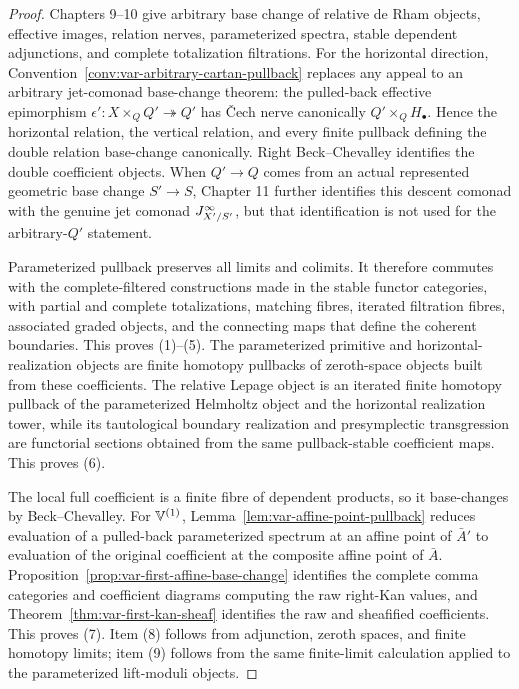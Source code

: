 \begin{proof}
Chapters 9--10 give arbitrary base change of relative de Rham objects, effective images, relation nerves, parameterized spectra, stable dependent adjunctions, and complete totalization filtrations. For the horizontal direction, Convention~\ref{conv:var-arbitrary-cartan-pullback} replaces any appeal to an arbitrary jet-comonad base-change theorem: the pulled-back effective epimorphism \(\epsilon':X\times_QQ'\twoheadrightarrow Q'\) has \v{C}ech nerve canonically \(Q'\times_QH_\bullet\). Hence the horizontal relation, the vertical relation, and every finite pullback defining the double relation base-change canonically. Right Beck--Chevalley identifies the double coefficient objects. When \(Q'\to Q\) comes from an actual represented geometric base change \(S'\to S\), Chapter 11 further identifies this descent comonad with the genuine jet comonad \(J^{\infty}_{X'/S'}\), but that identification is not used for the arbitrary-\(Q'\) statement.

Parameterized pullback preserves all limits and colimits. It therefore commutes with the complete-filtered constructions made in the stable functor categories, with partial and complete totalizations, matching fibres, iterated filtration fibres, associated graded objects, and the connecting maps that define the coherent boundaries. This proves (1)--(5). The parameterized primitive and horizontal-realization objects are finite homotopy pullbacks of zeroth-space objects built from these coefficients.  The relative Lepage object is an iterated finite homotopy pullback of the parameterized Helmholtz object and the horizontal realization tower, while its tautological boundary realization and presymplectic transgression are functorial sections obtained from the same pullback-stable coefficient maps.  This proves (6).

The local full coefficient is a finite fibre of dependent products, so it base-changes by Beck--Chevalley. For \(\mathbb V^{(1)}\), Lemma~\ref{lem:var-affine-point-pullback} reduces evaluation of a pulled-back parameterized spectrum at an affine point of \(\bar A'\) to evaluation of the original coefficient at the composite affine point of \(\bar A\). Proposition~\ref{prop:var-first-affine-base-change} identifies the complete comma categories and coefficient diagrams computing the raw right-Kan values, and Theorem~\ref{thm:var-first-kan-sheaf} identifies the raw and sheafified coefficients. This proves (7). Item (8) follows from adjunction, zeroth spaces, and finite homotopy limits; item (9) follows from the same finite-limit calculation applied to the parameterized lift-moduli objects.


\end{proof}

